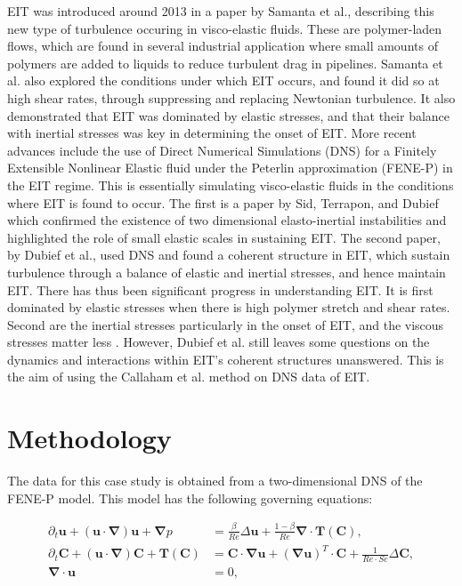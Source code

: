 \documentclass[12pt]{report} %
\begin{document}
EIT was introduced around 2013 in a paper by Samanta et al.\cite{Samanta2012eit}, describing this new type of turbulence occuring in visco-elastic fluids. These are polymer-laden flows, which are found in several industrial application where small amounts of polymers are added to liquids to reduce turbulent drag in pipelines. Samanta et al.\cite{Samanta2012eit} also explored the conditions under which EIT occurs, and found it did so at high shear rates, through suppressing and replacing Newtonian turbulence. It also demonstrated that EIT was dominated by elastic stresses, and that their balance with inertial stresses was key in determining the onset of EIT. More recent advances include the use of Direct Numerical Simulations (DNS) for a Finitely Extensible Nonlinear Elastic fluid under the Peterlin approximation (FENE-P) in the EIT regime\cite{beneitez2024multistability}. This is essentially simulating visco-elastic fluids in the conditions where EIT is found to occur. The first is a paper by Sid, Terrapon, and Dubief \cite{sid2018two} which confirmed the existence of two dimensional elasto-inertial instabilities and highlighted the role of small elastic scales in sustaining EIT. The second paper, by Dubief et al.\cite{dubief2022first}, used DNS and found a coherent structure in EIT, which sustain turbulence through a balance of elastic and inertial stresses, and hence maintain EIT. There has thus been significant progress in understanding EIT. It is first dominated by elastic stresses when there is high polymer stretch and shear rates. Second are the inertial stresses particularly in the onset of EIT, and the viscous stresses matter less \cite{Samanta2012eit, sid2018two, dubief2022first}. However, Dubief et al.\cite{dubief2022first} still leaves some questions on the dynamics and interactions within EIT's coherent structures unanswered. This is the aim of using the Callaham et al. method on DNS data of EIT\cite{beneitez2024multistability}.

\section{Methodology}

The data for this case study is obtained from a two-dimensional DNS of the FENE-P model. This model has the following governing equations:

\begin{equation}
  \begin{aligned}
    \partial_t \mathbf{u} + (\mathbf{u} \cdot \mathbf{\nabla}) \mathbf{u} + \mathbf{\nabla} p &= \frac{\beta}{Re} \Delta \mathbf{u} + \frac{1 - \beta}{Re} \mathbf{\nabla} \cdot \mathbf{T}(\mathbf{C}), \\
    \partial_t \mathbf{C} + (\mathbf{u} \cdot \mathbf{\nabla}) \mathbf{C} + \mathbf{T}(\mathbf{C}) &= \mathbf{C} \cdot \mathbf{\nabla} \mathbf{u} + (\mathbf{\nabla} \mathbf{u})^T \cdot \mathbf{C} + \frac{1}{Re \cdot Sc} \Delta \mathbf{C}, \\
    \mathbf{\nabla} \cdot \mathbf{u} &= 0,
  \end{aligned}
\end{equation}
\end{document}
